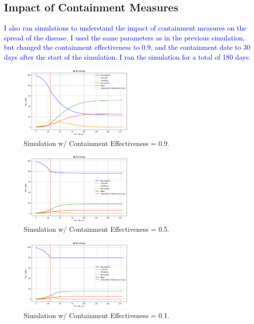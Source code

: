 \documentclass[%
 reprint,
superscriptaddress,
 amsmath,amssymb,
 aps,
]{revtex4-2}
\begin{document}
\subsection{Impact of Containment Measures}
\textcolor{blue}{I also ran simulations to understand the impact of containment measures on the spread of the disease. I used the same parameters as in the previous simulation, but changed the containment effectiveness to 0.9, and the containment date to 30 days after the start of the simulation. I ran the simulation for a total of 180 days.}
\begin{figure}[hbt!]
    \centering
    \includegraphics[width=0.5\textwidth]{ContainmentA.png}
    \caption{Simulation w/ Containment Effectiveness = 0.9.}
    \label{ContainmentA}
\end{figure}
\begin{figure}
    \centering
    \includegraphics[width=0.5\textwidth]{ContainmentB.png}
    \caption{Simulation w/ Containment Effectiveness = 0.5.}
    \label{ContainmentB}
\end{figure}
\begin{figure}
    \centering
    \includegraphics[width = 0.5\textwidth]{ContainmentC.png}
    \caption{Simulation w/ Containment Effectiveness = 0.1.}
    \label{ContainmentC}
\end{figure}
\end{document}
